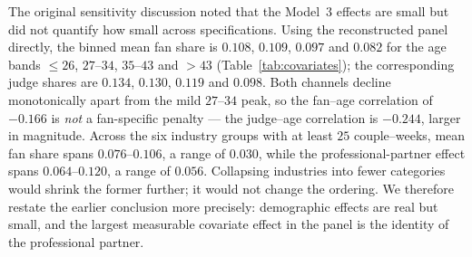 The original sensitivity discussion noted that the Model~3 effects are small but did not
quantify how small across specifications. Using the reconstructed panel directly, the binned
mean fan share is $0.108$, $0.109$, $0.097$ and $0.082$ for the age bands $\le26$, $27$--$34$,
$35$--$43$ and $>43$ (Table~\ref{tab:covariates}); the corresponding judge shares are
$0.134$, $0.130$, $0.119$ and $0.098$. Both channels decline monotonically apart from the
mild $27$--$34$ peak, so the fan--age correlation of $-0.166$ is \emph{not} a fan-specific
penalty --- the judge--age correlation is $-0.244$, larger in magnitude. Across the six
industry groups with at least $25$ couple--weeks, mean fan share spans $0.076$--$0.106$, a
range of $0.030$, while the professional-partner effect spans $0.064$--$0.120$, a range of
$0.056$. Collapsing industries into fewer categories would shrink the former further; it
would not change the ordering. We therefore restate the earlier conclusion more precisely:
demographic effects are real but small, and the largest measurable covariate effect in the
panel is the identity of the professional partner.

